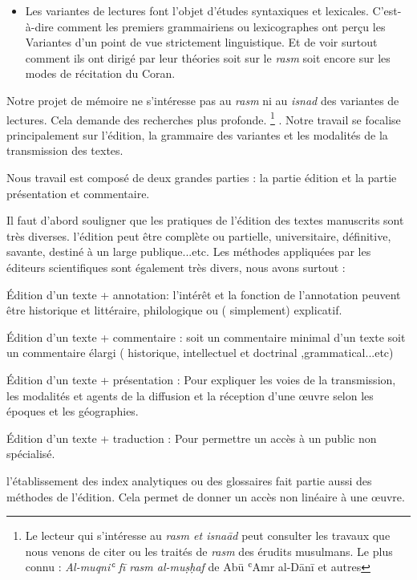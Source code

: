 \documentclass[a4paper,12pt]{report}
\begin{document}
\begin{itemize}
\begin{itemize}
{ }  

 \item  Les variantes de lectures  font l’objet d’études syntaxiques et lexicales. C’est-à-dire  comment les premiers grammairiens ou lexicographes ont perçu les Variantes d’un point de vue strictement linguistique. Et de voir surtout comment ils ont dirigé par leur théories soit sur le\textit{ rasm}  soit encore sur les modes de récitation du Coran.  

\end{itemize}

Notre projet de mémoire ne s'intéresse pas au \textit{rasm} ni au \textit{isnad} des variantes de lectures. Cela demande des recherches plus profonde. \footnote {Le lecteur qui s'intéresse au \textit{rasm et isna\=ad} peut consulter les travaux  que nous venons de citer ou les traités de \textit{rasm} des érudits musulmans. Le plus connu :  \textit{Al-muqniʿ fī rasm al-muṣḥaf }de Abū ʿAmr al-Dānī et autres } . Notre travail  se focalise principalement sur l'édition,   la grammaire des variantes et  les modalités de la transmission des textes.

Nous  travail est composé de deux grandes parties : la partie édition et la partie présentation et commentaire.  

Il faut d'abord  souligner que les pratiques  de l'édition des textes manuscrits sont très diverses. l'édition  peut être complète ou partielle, universitaire, définitive,  savante,  destiné à un large publique...etc.  Les méthodes appliquées par les éditeurs scientifiques   sont  également très divers, nous avons surtout :   

                Édition d'un texte + annotation:  l'intérêt et la fonction de l'annotation peuvent être historique et littéraire, philologique ou ( simplement) explicatif.

               Édition d'un texte + commentaire : soit un commentaire minimal d'un texte soit un commentaire élargi ( historique, intellectuel et doctrinal ,grammatical...etc)    

                Édition d'un texte + présentation : Pour expliquer les voies de  la transmission, les modalités et agents de la diffusion  et la réception  d'une œuvre selon les époques et les géographies.  

                Édition d'un texte + traduction : Pour permettre  un accès à un public  non spécialisé.  

             	l'établissement des index analytiques ou des glossaires fait partie aussi des méthodes de l'édition. Cela  permet de  donner un accès non linéaire à une œuvre. 




\end{itemize}
\end{document}
